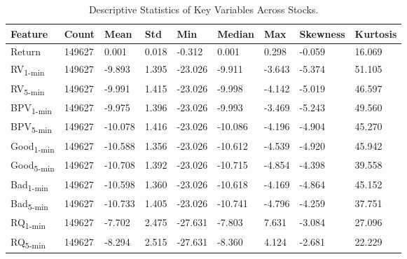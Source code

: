 \begin{table}[H]
    \centering
    \caption[Descriptive Statistics of Key Variables Across Stocks]{Descriptive Statistics of Key Variables Across Stocks.}
    \label{table:descriptive_statistics_dataset}
    \begin{adjustbox}{width=1\textwidth,center}
    \begin{tabular}{p{}p{}p{}p{}p{}p{}p{}p{}p{}}
        \toprule 
        \textbf{Feature} & \textbf{Count} & \textbf{Mean} & \textbf{Std} & \textbf{Min} & \textbf{Median} & \textbf{Max} & \textbf{Skewness} & \textbf{Kurtosis} \\
        \midrule
        Return  & 149627 & 0.001 & 0.018 & -0.312     & 0.001   & 0.298   & -0.059 & 16.069 \\
        RV\textsubscript{1-min}  & 149627 & -9.893 & 1.395 & -23.026    & -9.911  & -3.643  & -5.374 & 51.105 \\
        RV\textsubscript{5-min}  & 149627 & -9.991 & 1.415 & -23.026    & -9.998  & -4.142  & -5.019 & 46.597 \\
        BPV\textsubscript{1-min} & 149627 & -9.975 & 1.396 & -23.026    & -9.993  & -3.469  & -5.243 & 49.560 \\
        BPV\textsubscript{5-min} & 149627 & -10.078 & 1.416 & -23.026    & -10.086 & -4.196  & -4.904 & 45.270 \\
        Good\textsubscript{1-min} & 149627 & -10.588 & 1.356 & -23.026    & -10.612 & -4.539  & -4.920 & 45.942 \\
        Good\textsubscript{5-min} & 149627 & -10.708 & 1.392 & -23.026    & -10.715 & -4.854  & -4.398 & 39.558 \\
        Bad\textsubscript{1-min}  & 149627 & -10.598 & 1.360 & -23.026    & -10.618 & -4.169  & -4.864 & 45.152 \\
        Bad\textsubscript{5-min}  & 149627 & -10.733 & 1.405 & -23.026    & -10.741 & -4.796  & -4.259 & 37.751 \\
        RQ\textsubscript{1-min}       & 149627 & -7.702 & 2.475 & -27.631    & -7.803  & 7.631   & -3.084 & 27.096 \\
        RQ\textsubscript{5-min}       & 149627 & -8.294 & 2.515 & -27.631    & -8.360  & 4.124   & -2.681 & 22.229 \\
        \bottomrule
    \end{tabular}
    \end{adjustbox}
\end{table}

